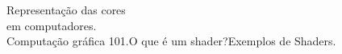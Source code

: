 \documentclass[preview]{standalone}
\begin{document}
Representação das cores \\ em computadores.\\Computação gráfica 101.O que é um shader?Exemplos de Shaders.\\
\end{document}
